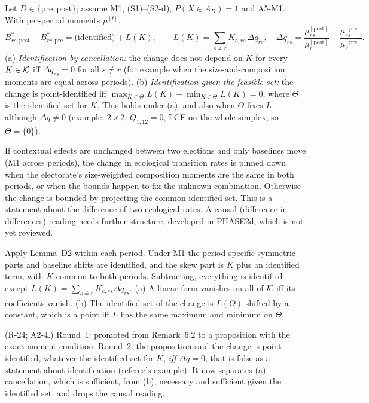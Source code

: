 \begin{result}\label{res:d8}
 Let $D\in\{\text{pre},\text{post}\}$; assume M1, (S1)--(S2-d),
$P(X\in A_D)=1$ and A5-M1. With per-period moments $\mu^{[t]}$,
\[
B^*_{rc,\text{post}}-B^*_{rc,\text{pre}}=\text{(identified)}+L(K),\qquad
L(K)=\sum_{s\ne r}K_{c,rs}\,\Delta q_{rs},\quad
\Delta q_{rs}=\frac{\mu^{[\text{post}]}_{rs}}{\mu^{[\text{post}]}_r}-\frac{\mu^{[\text{pre}]}_{rs}}{\mu^{[\text{pre}]}_r}.
\]
(a) \emph{Identification by cancellation:} the change does not depend on $K$ for
every $K\in\mathcal K$ iff $\Delta q_{rs}=0$ for all $s\ne r$ (for example when the
size-and-composition moments are equal across periods). (b) \emph{Identification
given the feasible set:} the change is point-identified iff
$\max_{K\in\Theta}L(K)-\min_{K\in\Theta}L(K)=0$, where $\Theta$ is the identified
set for $K$. This holds under (a), and also when $\Theta$ fixes $L$ although
$\Delta q\ne0$ (example: $2\times2$, $Q_{1,12}=0$, LCE on the whole simplex, so
$\Theta=\{0\}$).
\end{result}
\begin{plain}
If contextual effects are unchanged between two elections and only baselines move
(M1 across periods), the change in ecological transition rates is pinned down when
the electorate's size-weighted composition moments are the same in both periods,
or when the bounds happen to fix the unknown combination. Otherwise the change is
bounded by projecting the common identified set. This is a statement about the
difference of two ecological rates. A causal (difference-in-differences) reading
needs further structure, developed in PHASE2d, which is not yet reviewed.
\end{plain}
\begin{sketch}
Apply Lemma~D2 within each period. Under M1 the period-specific symmetric parts and
baseline shifts are identified, and the skew part is $K$ plus an identified term,
with $K$ common to both periods. Subtracting, everything is identified except
$L(K)=\sum_{s\ne r}K_{c,rs}\Delta q_{rs}$. (a) A linear form vanishes on all of
$\mathcal K$ iff its coefficients vanish. (b) The identified set of the change is
$L(\Theta)$ shifted by a constant, which is a point iff $L$ has the same maximum
and minimum on $\Theta$.
\end{sketch}
\begin{revnote}
(R-24; A2-4.) Round~1: promoted from Remark~6.2 to a proposition with the exact
moment condition. Round~2: the proposition said the change is point-identified,
whatever the identified set for $K$, \emph{iff} $\Delta q=0$; that is false as a
statement about identification (referee's example). It now separates (a)
cancellation, which is sufficient, from (b), necessary and sufficient given the
identified set, and drops the causal reading.
\end{revnote}

